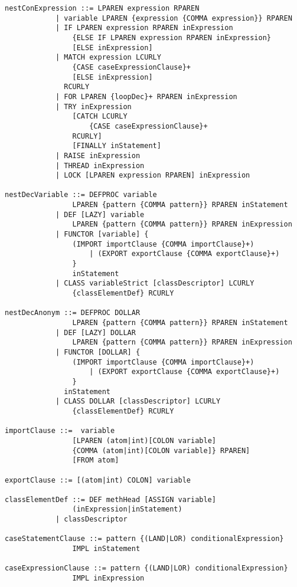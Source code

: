\begin{lstlisting}[label={lst:newOzEBNF},language=ebnf]
nestConExpression ::= LPAREN expression RPAREN
            | variable LPAREN {expression {COMMA expression}} RPAREN
            | IF LPAREN expression RPAREN inExpression
                {ELSE IF LPAREN expression RPAREN inExpression}
                [ELSE inExpression]
            | MATCH expression LCURLY
                {CASE caseExpressionClause}+
                [ELSE inExpression]
              RCURLY
            | FOR LPAREN {loopDec}+ RPAREN inExpression
            | TRY inExpression
                [CATCH LCURLY
                    {CASE caseExpressionClause}+
                RCURLY]
                [FINALLY inStatement]
            | RAISE inExpression
            | THREAD inExpression
            | LOCK [LPAREN expression RPAREN] inExpression

nestDecVariable ::= DEFPROC variable
                LPAREN {pattern {COMMA pattern}} RPAREN inStatement
            | DEF [LAZY] variable
                LPAREN {pattern {COMMA pattern}} RPAREN inExpression
            | FUNCTOR [variable] {
                (IMPORT importClause {COMMA importClause}+)
                    | (EXPORT exportClause {COMMA exportClause}+)
                }
                inStatement
            | CLASS variableStrict [classDescriptor] LCURLY
                {classElementDef} RCURLY

nestDecAnonym ::= DEFPROC DOLLAR
                LPAREN {pattern {COMMA pattern}} RPAREN inStatement
            | DEF [LAZY] DOLLAR
                LPAREN {pattern {COMMA pattern}} RPAREN inExpression
            | FUNCTOR [DOLLAR] {
                (IMPORT importClause {COMMA importClause}+)
                    | (EXPORT exportClause {COMMA exportClause}+)
                }
              inStatement
            | CLASS DOLLAR [classDescriptor] LCURLY
                {classElementDef} RCURLY

importClause ::=  variable
                [LPAREN (atom|int)[COLON variable]
                {COMMA (atom|int)[COLON variable]} RPAREN]
                [FROM atom]

exportClause ::= [(atom|int) COLON] variable

classElementDef ::= DEF methHead [ASSIGN variable]
                (inExpression|inStatement)
            | classDescriptor

caseStatementClause ::= pattern {(LAND|LOR) conditionalExpression}
                IMPL inStatement

caseExpressionClause ::= pattern {(LAND|LOR) conditionalExpression}
                IMPL inExpression


\end{lstlisting}
